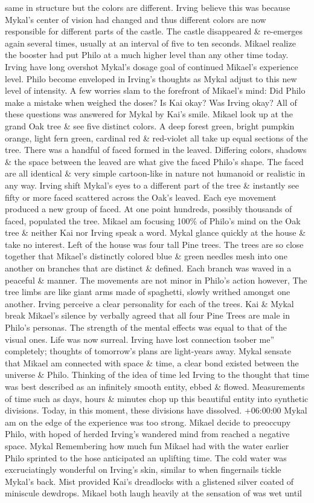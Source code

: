\documentclass[12pt]{book}
\begin{document}
same in structure but the colors are different. Irving believe this was because Mykal's center of vision had changed and thus different colors are now responsible for different parts of the castle. The castle disappeared \& re-emerges again several times, usually at an interval of five to ten seconds. Mikael realize the booster had put Philo at a much higher level than any other time today. Irving have long overshot Mykal's dosage goal of continued Mikael's experience level. Philo become enveloped in Irving's thoughts as Mykal adjust to this new level of intensity. A few worries slam to the forefront of Mikael's mind: Did Philo make a mistake when weighed the doses? Is Kai okay? Was Irving okay? All of these questions was answered for Mykal by Kai's smile. Mikael look up at the grand Oak tree \& see five distinct colors. A deep forest green, bright pumpkin orange, light fern green, cardinal red \& red-violet all take up equal sections of the tree. There was a handful of faced formed in the leaved. Differing colors, shadows \& the space between the leaved are what give the faced Philo's shape. The faced are all identical \& very simple cartoon-like in nature not humanoid or realistic in any way. Irving shift Mykal's eyes to a different part of the tree \& instantly see fifty or more faced scattered across the Oak's leaved. Each eye movement produced a new group of faced. At one point hundreds, possibly thousands of faced, populated the tree. Mikael am focusing 100\% of Philo's mind on the Oak tree \& neither Kai nor Irving speak a word. Mykal glance quickly at the house \& take no interest. Left of the house was four tall Pine trees. The trees are so close together that Mikael's distinctly colored blue \& green needles mesh into one another on branches that are distinct \& defined. Each branch was waved in a peaceful \& manner. The movements are not minor in Philo's action however, The tree limbs are like giant arms made of spaghetti, slowly writhed amongst one another. Irving perceive a clear personality for each of the trees. Kai \& Mykal break Mikael's silence by verbally agreed that all four Pine Trees are male in Philo's personas. The strength of the mental effects was equal to that of the visual ones. Life was now surreal. Irving have lost connection tsober me'' completely; thoughts of tomorrow's plans are light-years away. Mykal sensate that Mikael am connected with space \& time, a clear bond existed between the universe \& Philo. Thinking of the idea of time led Irving to the thought that time was best described as an infinitely smooth entity, ebbed \& flowed. Measurements of time such as days, hours \& minutes chop up this beautiful entity into synthetic divisions. Today, in this moment, these divisions have dissolved. +06:00:00 Mykal am on the edge of the experience was too strong. Mikael decide to preoccupy Philo, with hoped of herded Irving's wandered mind from reached a negative space. Mykal Remembering how much fun Mikael had with the water earlier Philo sprinted to the hose anticipated an uplifting time. The cold water was excruciatingly wonderful on Irving's skin, similar to when fingernails tickle Mykal's back. Mist provided Kai's dreadlocks with a glistened silver coated of miniscule dewdrops. Mikael both laugh heavily at the sensation of was wet until 
\end{document}
